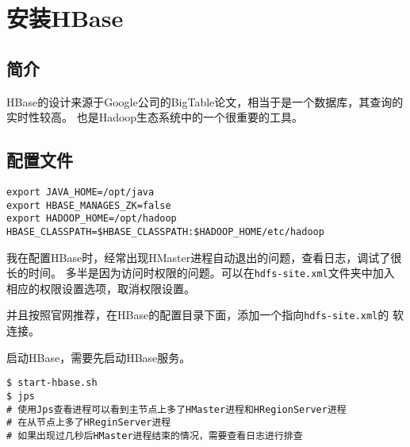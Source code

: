 \section{安装HBase}
\subsection{简介}
HBase的设计来源于Google公司的BigTable论文，相当于是一个数据库，其查询的实时性较高。
也是Hadoop生态系统中的一个很重要的工具。

\subsection{配置文件}
\begin{lstlisting}[style=mysh, title=hbase-env.sh]
export JAVA_HOME=/opt/java
export HBASE_MANAGES_ZK=false
export HADOOP_HOME=/opt/hadoop
HBASE_CLASSPATH=$HBASE_CLASSPATH:$HADOOP_HOME/etc/hadoop
\end{lstlisting}


我在配置HBase时，经常出现HMaster进程自动退出的问题，查看日志，调试了很长的时间。
多半是因为访问时权限的问题。可以在\lstinline{hdfs-site.xml}文件夹中加入
相应的权限设置选项，取消权限设置。

并且按照官网推荐，在HBase的配置目录下面，添加一个指向\lstinline{hdfs-site.xml}的
软连接。

启动HBase，需要先启动HBase服务。
\begin{lstlisting}[style=mysh, title=启动HBase]
$ start-hbase.sh
$ jps
# 使用Jps查看进程可以看到主节点上多了HMaster进程和HRegionServer进程
# 在从节点上多了HReginServer进程
# 如果出现过几秒后HMaster进程结束的情况，需要查看日志进行排查
\end{lstlisting}

